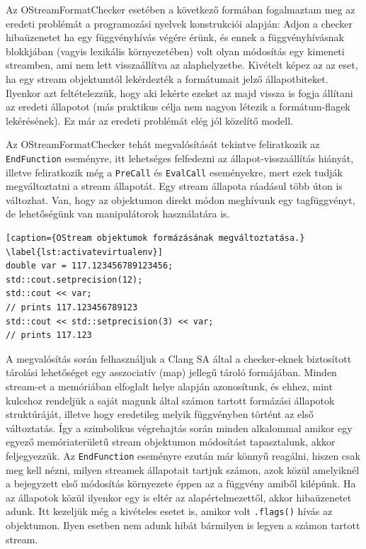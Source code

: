 \documentclass[a4paper,12pt]{report}
\begin{document}
Az OStreamFormatChecker esetében a következő formában fogalmaztam meg az eredeti problémát a programozási nyelvek konstrukciói alapján: Adjon a checker hibaüzenetet ha egy függvényhívás végére érünk, és ennek a függvényhívásnak blokkjában (vagyis lexikális környezetében) volt olyan módosítás egy kimeneti streamben, ami nem lett visszaállítva az alaphelyzetbe. Kivételt képez az az eset, ha egy stream objektumtól lekérdezték a formátumait jelző állapotbiteket. Ilyenkor azt feltételezzük, hogy aki lekérte ezeket az majd vissza is fogja állítani az eredeti állapotot (más praktikus célja nem nagyon létezik a formátum-flagek lekérésének). Ez már az eredeti problémát elég jól közelítő modell.

Az OStreamFormatChecker tehát megvalósítását tekintve feliratkozik az \texttt{EndFunction} eseményre, itt lehetséges felfedezni az állapot-visszaállítás hiányát, illetve feliratkozik még a \texttt{PreCall} és \texttt{EvalCall} eseményekre, mert ezek tudják megváltoztatni a stream állapotát. Egy stream állapota ráadásul több úton is változhat. Van, hogy az objektumon direkt módon meghívunk egy tagfüggvényt, de lehetőségünk van manipulátorok használatára is.

\begin{lstlisting}[caption={OStream objektumok formázásának megváltoztatása.}
\label{lst:activatevirtualenv}]
double var = 117.123456789123456;
std::cout.setprecision(12);
std::cout << var;
// prints 117.123456789123
std::cout << std::setprecision(3) << var;
// prints 117.123
\end{lstlisting}

A megvalósítás során felhasználjuk a Clang SA által a checker-eknek biztosított tárolási lehetőséget egy asszociatív (map) jellegű tároló formájában. Minden stream-et a memóriában elfoglalt helye alapján azonosítunk, és ehhez, mint kulcshoz rendeljük a saját magunk által számon tartott formázási állapotok struktúráját, illetve hogy eredetileg melyik függvényben történt az első változtatás. Így a szimbolikus végrehajtás során minden alkalommal amikor egy egyező memóriaterületű stream objektumon módosítást tapasztalunk, akkor feljegyezzük. Az \texttt{EndFunction} eseményre ezután már könnyű reagálni, hiszen csak meg kell nézni, milyen streamek állapotait tartjuk számon, azok közül amelyiknél a bejegyzett első módosítás környezete éppen az a függvény amiből kilépünk. Ha az állapotok közül ilyenkor egy is eltér az alapértelmezettől, akkor hibaüzenetet adunk. Itt kezeljük még a kivételes esetet is, amikor volt \texttt{.flags()} hívás az objektumon. Ilyen esetben nem adunk hibát bármilyen is legyen a számon tartott stream.
\end{document}
